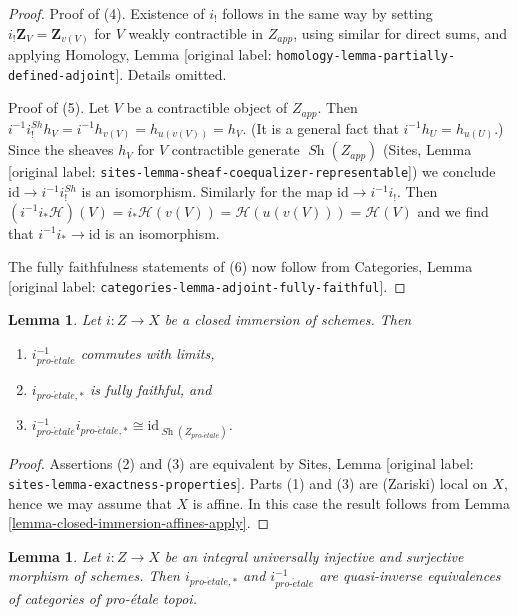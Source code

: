 \documentclass[10pt,a4paper]{article}
\theoremstyle{plain}
\newtheorem{lemma}[subsection]{Lemma}
\theoremstyle{definition}
\theoremstyle{remark}
\numberwithin{equation}{subsection}
\def\Sh{\mathop{\mathit{Sh}}\nolimits}
\def\proetale{{pro\text{-}\acute{e}tale}}
\begin{document}
\begin{proof}
\medskip\noindent
Proof of (4). Existence of $i_!$ follows in the same way by setting
$i_!\mathbf{Z}_V = \mathbf{Z}_{v(V)}$ for $V$ weakly contractible in $Z_{app}$,
using similar for direct sums, and applying
Homology, Lemma [original label: \nolinkurl{homology-lemma-partially-defined-adjoint}].
Details omitted.

\medskip\noindent
Proof of (5). Let $V$ be a contractible object of $Z_{app}$.
Then $i^{-1}i^{Sh}_!h_V = i^{-1}h_{v(V)} = h_{u(v(V))} = h_V$.
(It is a general fact that $i^{-1}h_U = h_{u(U)}$.) Since the
sheaves $h_V$ for $V$ contractible generate $\Sh(Z_{app})$
(Sites, Lemma [original label: \nolinkurl{sites-lemma-sheaf-coequalizer-representable}])
we conclude $\text{id} \to i^{-1}i^{Sh}_!$ is an isomorphism.
Similarly for the map $\text{id} \to i^{-1}i_!$. Then
$(i^{-1}i_*\mathcal{H})(V) = i_*\mathcal{H}(v(V)) =
\mathcal{H}(u(v(V))) = \mathcal{H}(V)$ and we find that
$i^{-1}i_* \to \text{id}$ is an isomorphism.

\medskip\noindent
The fully faithfulness statements of (6) now follow from
Categories, Lemma [original label: \nolinkurl{categories-lemma-adjoint-fully-faithful}].
\end{proof}

\begin{lemma}
\label{lemma-closed-immersion}
Let $i : Z \to X$ be a closed immersion of schemes. Then
\begin{enumerate}
\item $i_\proetale^{-1}$ commutes with limits,
\item $i_{\proetale, *}$ is fully faithful, and
\item $i_\proetale^{-1}i_{\proetale, *} \cong \text{id}_{\Sh(Z_\proetale)}$.
\end{enumerate}
\end{lemma}

\begin{proof}
Assertions (2) and (3) are equivalent by
Sites, Lemma [original label: \nolinkurl{sites-lemma-exactness-properties}].
Parts (1) and (3) are (Zariski) local on $X$, hence we may assume that
$X$ is affine. In this case the result follows from
Lemma \ref{lemma-closed-immersion-affines-apply}.
\end{proof}

\begin{lemma}
\label{lemma-thickening}
Let $i : Z \to X$ be an integral universally injective and surjective morphism
of schemes. Then
$i_{\proetale, *}$ and $i_\proetale^{-1}$ are quasi-inverse
equivalences of categories of pro-\'etale topoi.
\end{lemma}
\end{document}
